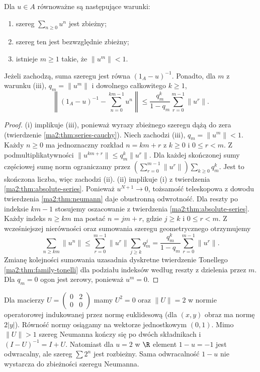 \begin{wniosek}
\label{ma2:cor:neumann-power}
Dla $u\in A$ równoważne są następujące warunki:
\begin{enumerate}[label=(\roman*)]
\item szereg $\sum_{n\ge0}u^n$ jest zbieżny;
\item szereg ten jest bezwzględnie zbieżny;
\item istnieje $m\ge1$ takie, że $\|u^m\|<1$.
\end{enumerate}
Jeżeli zachodzą, suma szeregu jest równa
$(1_A-u)^{-1}$. Ponadto, dla $m$ z warunku (iii),
$q_m=\|u^m\|$ i dowolnego całkowitego $k\ge1$,
\[
 \left\|(1_A-u)^{-1}-\sum_{n=0}^{km-1}u^n\right\|
 \le \frac{q_m^k}{1-q_m}
           \sum_{r=0}^{m-1}\|u^r\|.
\]
\end{wniosek}
\begin{proof}
(i) implikuje (iii), ponieważ wyrazy zbieżnego
szeregu dążą do zera (twierdzenie
\ref{ma2:thm:series-cauchy}).
Niech zachodzi (iii), $q_m=\|u^m\|<1$.
Każdy $n\ge0$ ma jednoznaczny rozkład
$n=km+r$ z $k\ge0$ i $0\le r<m$.
Z podmultiplikatywności
$\|u^{km+r}\|\le q_m^k\|u^r\|$.
Dla każdej skończonej sumy częściowej sumę norm
ograniczamy przez
$(\sum_{r=0}^{m-1}\|u^r\|)\sum_{k\ge0}q_m^k$.
Jest to skończona liczba, więc zachodzi (ii).
(ii) implikuje (i) z twierdzenia
\ref{ma2:thm:absolute-series}.
Ponieważ $u^{N+1}\to0$, tożsamość teleskopowa
z dowodu twierdzenia \ref{ma2:thm:neumann}
daje obustronną odwrotność.
Dla reszty po indeksie $km-1$ stosujemy oszacowanie
z twierdzenia \ref{ma2:thm:absolute-series}.
Każdy indeks $n\ge km$ ma postać $n=jm+r$,
gdzie $j\ge k$ i $0\le r<m$. Z wcześniejszej
nierówności oraz sumowania szeregu geometrycznego
otrzymujemy
\[
 \sum_{n\ge km}\|u^n\|
 \le \sum_{r=0}^{m-1}\|u^r\|
        \sum_{j\ge k}q_m^j
 =\frac{q_m^k}{1-q_m}\sum_{r=0}^{m-1}\|u^r\|.
\]
Zmianę kolejności sumowania uzasadnia dyskretne
twierdzenie Tonellego \ref{ma2:thm:family-tonelli}
dla podziału indeksów według reszty z dzielenia przez $m$.
Dla $q_m=0$ ogon jest zerowy, ponieważ $u^m=0$.
\end{proof}

\begin{przyklad}
\label{ma2:ex:neumann-nilpotent}
Dla macierzy $U=\begin{pmatrix}0&2\\0&0\end{pmatrix}$
mamy $U^2=0$ oraz $\|U\|=2$ w normie operatorowej
indukowanej przez normę euklidesową (dla
$(x,y)$ obraz ma normę $2|y|$).
Równość normy osiągamy na wektorze jednostkowym
$(0,1)$. Mimo $\|U\|>1$ szereg Neumanna kończy się po
dwóch składnikach i $(I-U)^{-1}=I+U$.
Natomiast dla $u=2$ w $\R$ element $1-u=-1$
jest odwracalny, ale szereg $\sum 2^n$ jest rozbieżny.
Sama odwracalność $1-u$ nie wystarcza do zbieżności
szeregu Neumanna.
\end{przyklad}

